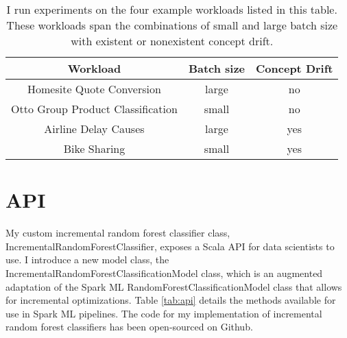 \begin{table}
  \centering
  \begin{tabular}{ | c | c | c | }
    \hline
    \textbf{Workload} & \textbf{Batch size} & \textbf{Concept Drift} \\
    \hline
    Homesite Quote Conversion & large & no \\
    \hline
    Otto Group Product Classification & small & no \\
    \hline
    Airline Delay Causes & large & yes \\
    \hline
    Bike Sharing & small & yes \\
    \hline
  \end{tabular}
  \caption{I run experiments on the four example workloads listed in this table. These workloads span the combinations of small and large batch size with existent or nonexistent concept drift.}
  \label{tab:workloads}
\end{table}

\section{API}

My custom incremental random forest classifier class,
IncrementalRandomForestClassifier, exposes a Scala API for data scientists to
use. I introduce a new model class, the
IncrementalRandomForestClassificationModel class, which is an augmented
adaptation of the Spark ML RandomForestClassificationModel class that allows
for incremental optimizations. Table \ref{tab:api} details the methods
available for use in Spark ML pipelines. The code for my implementation of
incremental random forest classifiers has been open-sourced on Github.

